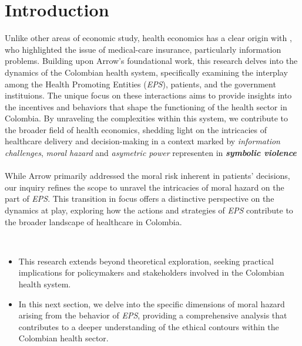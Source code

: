 \documentclass[11pt]{article}
\begin{document}
\section*{Introduction}
\begin{flushleft}
    Unlike other areas of economic study, health economics has a clear origin with \citet{arrow1963uncertainty}, who highlighted the issue of medical-care insurance, particularly information problems. Building upon Arrow's foundational work, this research delves into the dynamics of the Colombian health system, specifically examining the interplay among the Health Promoting Entities (\textit{EPS}), patients, and the government instituions. The unique focus on these interactions aims to provide insights into the incentives and behaviors that shape the functioning of the health sector in Colombia. By unraveling the complexities within this system, we contribute to the broader field of health economics, shedding light on the intricacies of healthcare delivery and decision-making in a context marked by \textit{information challenges}, \textit{moral hazard} and \textit{asymetric power} representen in \textit{\textbf{symbolic violence}}\\~\\

    While Arrow primarily addressed the moral risk inherent in patients' decisions, our inquiry refines the scope to unravel the intricacies of moral hazard on the part of \textit{EPS}. This transition in focus offers a distinctive perspective on the dynamics at play, exploring how the actions and strategies of \textit{EPS} contribute to the broader landscape of healthcare in Colombia.\par~\par
    
    \begin{snippet}
        \begin{itemize}
            \item This research extends beyond theoretical exploration, seeking practical implications for policymakers and stakeholders involved in the Colombian health system.
            \item In this next section, we delve into the specific dimensions of moral hazard arising from the behavior of \textit{EPS}, providing a comprehensive analysis that contributes to a deeper understanding of the ethical contours within the Colombian health sector.
        \end{itemize}
    \end{snippet}

\end{flushleft}
\end{document}
